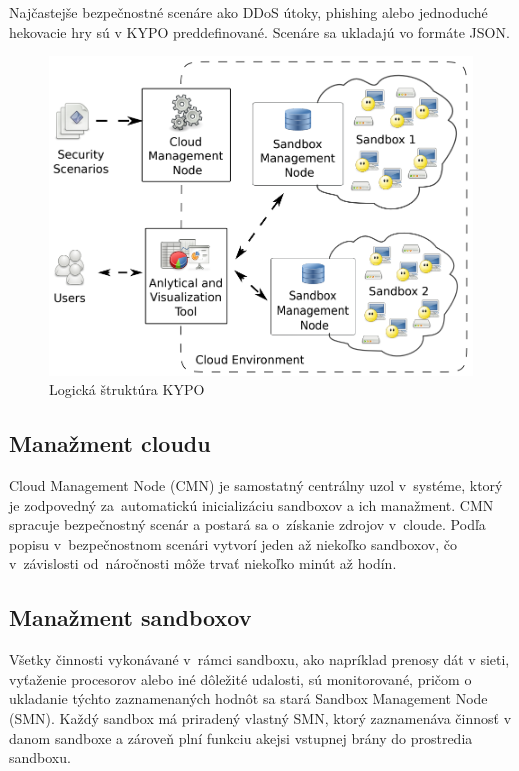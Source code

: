 \documentclass[
  digital, %
  twoside, %
  notable,   %
  nolof,   %
  nolot,   %
]{fithesis3}
\begin{document}
Najčastejše bezpečnostné scenáre ako DDoS útoky, phishing alebo jednoduché hekovacie hry sú v KYPO preddefinované. Scenáre sa ukladajú vo formáte JSON\cite{eichler2015kypo}.

\begin{figure}
	\center
	\includegraphics[width=0.875\linewidth]{kypo_logic_structure}
	\caption{Logická štruktúra KYPO\cite{eichler2015kypo}}
	\label{kypo_logic_structure}
\end{figure}

\subsection{Manažment cloudu}
Cloud Management Node (CMN) je samostatný centrálny uzol v~systéme, ktorý je zodpovedný za~automatickú inicializáciu sandboxov a ich manažment. CMN spracuje bezpečnostný scenár a postará sa o~získanie zdrojov v~cloude. Podľa popisu v~bezpečnostnom scenári vytvorí jeden až niekoľko sandboxov, čo v~závislosti od~náročnosti môže trvať niekoľko minút až hodín\cite{eichler2015kypo}.

\subsection{Manažment sandboxov}
\label{smn}
Všetky činnosti vykonávané v~rámci sandboxu, ako napríklad prenosy dát v sieti, vyťaženie procesorov alebo iné dôležité udalosti, sú monitorované, pričom o ukladanie týchto zaznamenaných hodnôt sa stará Sandbox Management Node (SMN). Každý sandbox má priradený vlastný SMN, ktorý zaznamenáva činnosť v danom sandboxe a zároveň plní funkciu akejsi vstupnej brány do prostredia sandboxu\cite{eichler2014analytical}.
\end{document}
